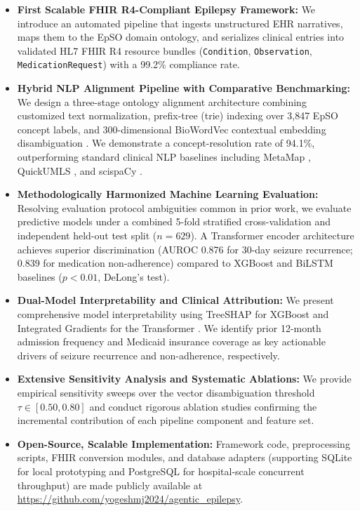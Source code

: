 \documentclass[11pt,a4paper]{article}
\begin{document}
\begin{itemize}[leftmargin=*, itemsep=0.2em]
    \item \textbf{First Scalable FHIR R4-Compliant Epilepsy Framework:} We introduce an automated pipeline that ingests unstructured EHR narratives, maps them to the EpSO domain ontology, and serializes clinical entries into validated HL7 FHIR R4 resource bundles (\texttt{Condition}, \texttt{Observation}, \texttt{MedicationRequest}) with a 99.2\% compliance rate.
    \item \textbf{Hybrid NLP Alignment Pipeline with Comparative Benchmarking:} We design a three-stage ontology alignment architecture combining customized text normalization, prefix-tree (trie) indexing over 3,847 EpSO concept labels, and 300-dimensional BioWordVec contextual embedding disambiguation \cite{zhang2019biowordvec}. We demonstrate a concept-resolution rate of 94.1\%, outperforming standard clinical NLP baselines including MetaMap \cite{aronson2001overview}, QuickUMLS \cite{soldaini2016quickumls}, and scispaCy \cite{neumann2019scispacy}.
    \item \textbf{Methodologically Harmonized Machine Learning Evaluation:} Resolving evaluation protocol ambiguities common in prior work, we evaluate predictive models under a combined 5-fold stratified cross-validation and independent held-out test split ($n=629$). A Transformer encoder architecture achieves superior discrimination (AUROC 0.876 for 30-day seizure recurrence; 0.839 for medication non-adherence) compared to XGBoost \cite{chen2016xgboost} and BiLSTM \cite{hochreiter1997long} baselines ($p < 0.01$, DeLong's test).
    \item \textbf{Dual-Model Interpretability and Clinical Attribution:} We present comprehensive model interpretability using TreeSHAP for XGBoost \cite{lundberg2017unified} and Integrated Gradients for the Transformer \cite{sundararajan2017axiomatic}. We identify prior 12-month admission frequency and Medicaid insurance coverage as key actionable drivers of seizure recurrence and non-adherence, respectively.
    \item \textbf{Extensive Sensitivity Analysis and Systematic Ablations:} We provide empirical sensitivity sweeps over the vector disambiguation threshold $\tau \in [0.50, 0.80]$ and conduct rigorous ablation studies confirming the incremental contribution of each pipeline component and feature set.
    \item \textbf{Open-Source, Scalable Implementation:} Framework code, preprocessing scripts, FHIR conversion modules, and database adapters (supporting SQLite for local prototyping and PostgreSQL for hospital-scale concurrent throughput) are made publicly available at \url{https://github.com/yogeshmj2024/agentic_epilepsy}.
\end{itemize}
\end{document}
